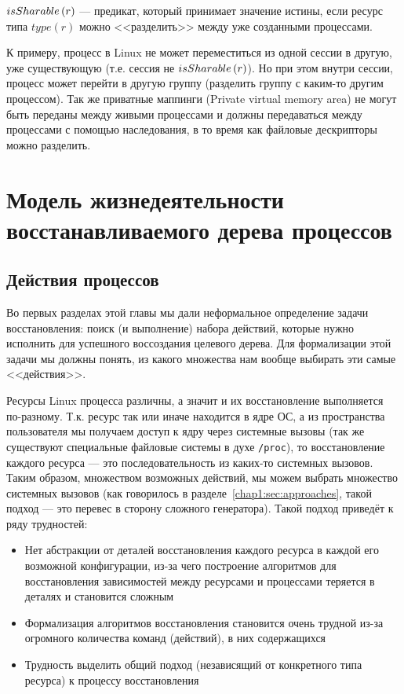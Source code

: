 \begin{defn}
\label{def:issharable}
$isSharable\left( r \right)$ --- предикат, который принимает значение истины, если ресурс типа  $type(r)$ можно <<разделить>> 
между уже созданными процессами.
\end{defn}

\begin{exmp}
К примеру, процесс в Linux не может переместиться из одной сессии в другую, уже существующую (т.е. сессия не 
$isSharable\left( r \right)$). Но при этом внутри сессии, процесс может перейти в другую группу (разделить группу с каким-то 
другим процессом). Так же приватные маппинги (Private virtual memory area) не могут быть переданы между живыми 
процессами и должны передаваться между процессами с помощью наследования, в то время как файловые дескрипторы можно разделить.
\end{exmp}

\section{Модель жизнедеятельности восстанавливаемого дерева процессов}
\label{chap2:sec:processlifemodel}

\subsection{Действия процессов}

Во первых разделах этой главы мы дали неформальное определение задачи восстановления: поиск (и выполнение) набора действий, которые нужно исполнить для успешного воссоздания целевого дерева. Для формализации этой задачи мы должны понять, из какого множества нам вообще выбирать эти самые <<действия>>.

Ресурсы Linux процесса различны, а значит и их восстановление выполняется по-разному. Т.к. ресурс так или иначе находится в ядре ОС, а из пространства пользователя мы получаем доступ к ядру через системные вызовы (так же существуют специальные файловые системы в духе \texttt{/proc}), то восстановление каждого ресурса --- это последовательность из каких-то системных вызовов. Таким образом, множеством возможных действий, мы можем выбрать множество системных вызовов (как говорилось в разделе~\ref{chap1:sec:approaches}, такой подход --- это перевес в сторону сложного генератора). Такой подход приведёт к ряду трудностей:

\begin{itemize}
	\item Нет абстракции от деталей восстановления каждого ресурса в каждой его возможной конфигурации, из-за чего построение алгоритмов для восстановления зависимостей между ресурсами и процессами теряется в деталях и становится сложным
	\item Формализация алгоритмов восстановления становится очень трудной из-за огромного количества команд (действий), в них содержащихся
	\item Трудность выделить общий подход (независящий от конкретного типа ресурса) к процессу восстановления
\end{itemize}

